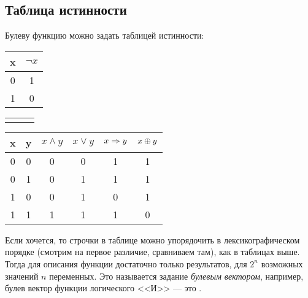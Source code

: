 \documentclass[a4paper]{report}
\begin{document}
    \subsection{Таблица истинности}
    Булеву функцию можно задать таблицей истинности:
    \begin{table}[!ht]
        \centering
        \begin{tabular}{c | c}
            x & $\neg x$ \\
            \hline
            0 & 1        \\
            1 & 0        \\
        \end{tabular}
        \begin{tabular}{c c c}
            & &
        \end{tabular}
        \begin{tabular}{c c | c c c c}
            x & y & $x \land y$ & $x \lor y$ & $x \Rightarrow y$ & $x \oplus y$ \\
            \hline
            0 & 0 & 0           & 0          & 1           & 1          \\
            0 & 1 & 0           & 1          & 1           & 1          \\
            1 & 0 & 0           & 1          & 0           & 1          \\
            1 & 1 & 1           & 1          & 1           & 0          \\
        \end{tabular}
    \end{table}
    Если хочется, то строчки в таблице можно упорядочить в лексикографическом порядке (смотрим на первое различие, сравниваем там), как в таблицах выше.
    Тогда для описания функции достаточно только результатов, для $2^n$ возможных значений $n$ переменных.
    Это называется задание \textit{булевым вектором}, например, булев вектор функции логического <<И>> --- это .

\end{document}
